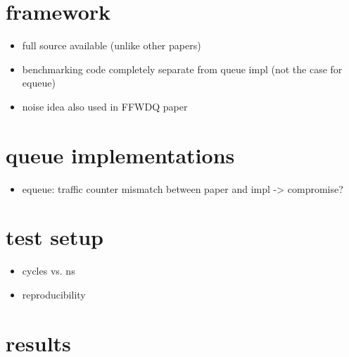 \documentclass{article}
\begin{document}
\section{framework}
\begin{itemize}
    \item full source available (unlike other papers)
    \item benchmarking code completely separate from queue impl (not
        the case for equeue)
    \item noise idea also used in FFWDQ paper
\end{itemize}

\section{queue implementations}
\begin{itemize}
    \item equeue: traffic counter mismatch between paper and impl -> compromise?
\end{itemize}

\section{test setup}
\begin{itemize}
    \item cycles vs. ns
    \item reproducibility
\end{itemize}

\section{results}
\end{document}
